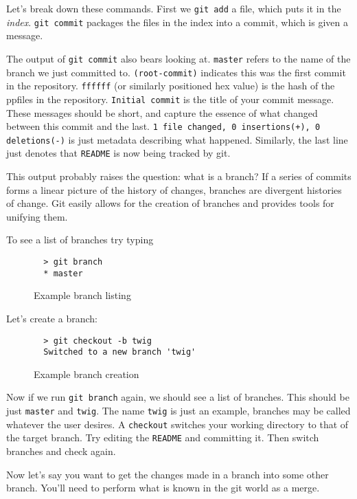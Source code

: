 \documentclass[11pt]{report}
\begin{document}
Let's break down these commands. First we \texttt{git add} a file,
which puts it in the \emph{index}. \texttt{git commit} packages the
files in the index into a commit, which is given a message.

The output of \texttt{git commit} also bears looking
at. \texttt{master} refers to the name of the branch we just committed
to. \texttt{(root-commit)} indicates this was the first commit in the
repository. \texttt{ffffff} (or similarly positioned hex value) is the
hash of the ppfiles in the repository. \texttt{Initial commit} is the
title of your commit message. These messages should be short, and
capture the essence of what changed between this commit and the
last. \texttt{1 file changed, 0 insertions(+), 0 deletions(-)} is just
metadata describing what happened. Similarly, the last line just
denotes that \texttt{README} is now being tracked by git.

This output probably raises the question: what is a branch?  If a
series of commits forms a linear picture of the history of changes,
branches are divergent histories of change. Git easily allows for the
creation of branches and provides tools for unifying them.

To see a list of branches try typing 
\begin{figure}[H]
  \caption{Example branch listing}
  \begin{lstlisting}
  > git branch
  * master
  \end{lstlisting}
 \end{figure}

Let's create a branch:
\begin{figure}[H]
  \caption{Example branch creation}
  \begin{lstlisting}
  > git checkout -b twig
  Switched to a new branch 'twig'
  \end{lstlisting}
\end{figure}

Now if we run \texttt{git branch} again, we should see a list of
branches. This should be just \texttt{master} and \texttt{twig}.
The name \texttt{twig} is just an example, branches may be called
whatever the user desires. A \texttt{checkout} switches your working
directory to that of the target branch. Try editing the \texttt{README}
and committing it. Then switch branches and check again.

Now let's say you want to get the changes made in a branch into some other
branch. You'll need to perform what is known in the git world as a
merge.
\end{document}
